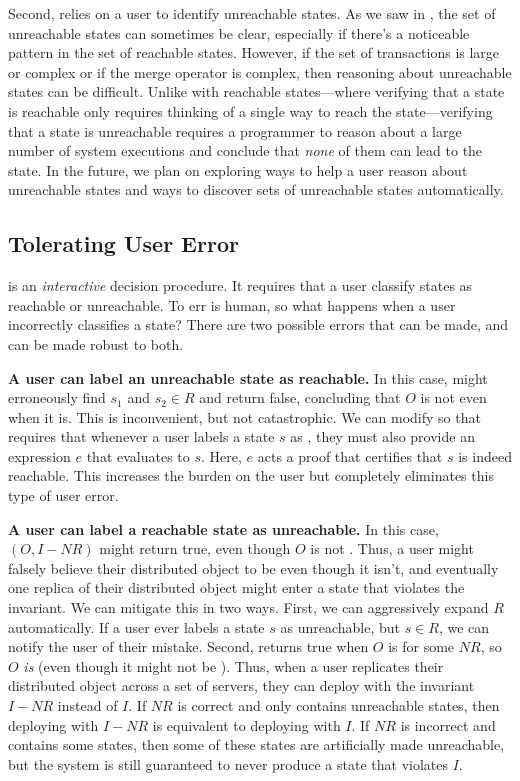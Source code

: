 Second,  relies on a user to identify
unreachable states. As we saw in , the set of
unreachable states can sometimes be clear, especially if there's a noticeable
pattern in the set of reachable states. However, if the set of transactions is
large or complex or if the merge operator is complex, then reasoning about
unreachable states can be difficult.  Unlike with reachable states---where
verifying that a state is reachable only requires thinking of a single way to
reach the state---verifying that a state is unreachable requires a programmer
to reason about a large number of system executions and conclude that
\emph{none} of them can lead to the state. In the future, we plan on exploring
ways to help a user reason about unreachable states and ways to discover sets of
unreachable states automatically.

\subsection{Tolerating User Error}
 is an \emph{interactive} decision
procedure. It requires that a user classify states as reachable or
unreachable.  To err is human, so what happens when a user incorrectly
classifies a state?  There are two possible errors that can be made, and
 can be made robust to both.

\textbf{A user can label an unreachable state as reachable.}
In this case, \Helper{} might erroneously find $s_1$ and $s_2 \in R$ and
return false, concluding that $O$ is not \sTIconfluent{} even when it is.
This is inconvenient, but not catastrophic. We can modify
 so that \Helper{} requires that
whenever a user labels a state $s$ as \sTIreachable{}, they must also provide
an \sTIreachable{} expression $e$ that evaluates to $s$. Here, $e$ acts a
proof that certifies that $s$ is indeed reachable. This increases the burden
on the user but completely eliminates this type of user error.

\textbf{A user can label a reachable state as unreachable.}
In this case, \IsIclosed$(O, I - NR)$ might return true, even though $O$ is
not \sTIconfluent. Thus, a user might falsely believe their distributed
object to be \sTIconfluent{} even though it isn't, and eventually one replica
of their distributed object might enter a state that violates the invariant.
%
We can mitigate this in two ways. First, we can aggressively expand $R$
automatically. If a user ever labels a state $s$ as unreachable, but $s \in
R$, we can notify the user of their mistake. Second, \Helper{} returns true
when $O$ is  for some $NR$, so $O$ \emph{is}
 (even though it might not be \sTIconfluent{}).
Thus, when a user replicates their distributed object across a set of
servers, they can deploy with the invariant $I - NR$ instead of $I$. If $NR$
is correct and only contains unreachable states, then deploying with $I - NR$
is equivalent to deploying with $I$. If $NR$ is incorrect and contains some
\sTIreachable{} states, then some of these states are artificially made
unreachable, but the system is still guaranteed to never produce a state
that violates $I$.
